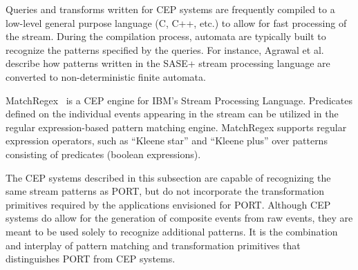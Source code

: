 Queries and transforms written for CEP systems are
frequently compiled to a low-level general purpose language (C, C++, etc.) to allow for fast
processing of the stream. During the compilation process, automata are typically
built to recognize the patterns specified by the queries. For instance, Agrawal et
al.~\cite{DBLP:conf/sigmod/AgrawalDGI08} describe how patterns written in the SASE+ stream
processing language are converted to non-deterministic finite automata. 

MatchRegex~\cite{DBLP:conf/debs/Hirzel12} is a CEP engine for IBM’s Stream Processing
Language. Predicates defined on the individual events appearing in the
stream can be utilized in the regular expression-based pattern matching
engine. MatchRegex supports regular expression operators, such as “Kleene star”
and “Kleene plus” over patterns consisting of predicates (boolean expressions).

The CEP systems described in this subsection are capable
of recognizing the same stream patterns as PORT,
but do not incorporate the
transformation primitives 
required by the applications
envisioned for PORT. Although CEP systems do allow for the
generation of composite events from raw events,
they are meant
to be used solely to recognize additional patterns.
It is the combination and interplay of pattern matching and transformation
primitives that distinguishes PORT from CEP systems.



